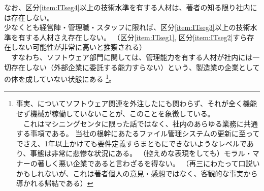 \begin{hosoku}
なお、区分\ref{item:ITseg4}\hx 以上の技術水準を有する人材は、著者の知る限り社内には存在しない。\\
少なくとも経営陣・管理職・スタッフに限れば、区分\ref{item:ITseg3}\hx 以上の技術水準を有する人材さえ存在しない。
（区分\ref{item:ITseg1}, 区分\ref{item:ITseg2}\hx すら存在しない可能性が非常に高いと推察される）\\
　すなわち、ソフトウェア部門に関しては、管理能力を有する人材が社内には一切存在しない（外部企業に委託する能力すらない）という、製造業の企業としての体を成していない状態にある
\footnote{事実、\DMname についてソフトウェア関連を外注したにも関わらず、それが全く機能せず機械が稼働していないことが、このことを象徴している。\\
　これはマシニングセンタに限った話ではなく、社内のあらゆる業務に共通する事項である。
当社の根幹にあたるファイル管理システムの更新に至ってでさえ、1年以上かけても要件定義すらまともにできないようなレベルであり、事態は非常に悲惨な状況にある。
（控えめな表現をしても）モラル・マナーの著しく悪い企業であると言わざるを得ない。
（再三にわたって口説いかもしれないが、これは著者個人の意見・感想ではなく、客観的な事実から導かれる帰結である）}。

\end{hosoku}
